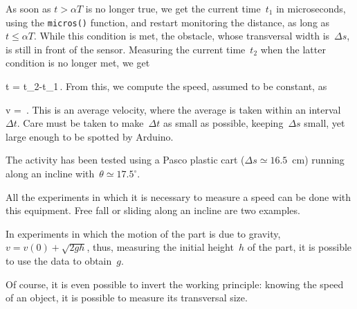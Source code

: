 \documentclass{extra}
\begin{document}
As soon as $t>\alpha T$ is no longer true, we get the current time~$t_1$ in microseconds, using the {\tt micros()} function, and restart monitoring the distance, as long as~$t\le \alpha T$. While this condition is met, the obstacle, whose transversal width is~$\Delta s$, is still in front of the sensor. Measuring the current time~$t_2$ when the latter condition is no longer met, we get

\beq
\Delta t = t_2-t_1\,.
\eeq
From this, we compute the speed, assumed to be constant, as

\beq
v = \,.
\eeq
This is an average velocity, where the average is taken within an interval~$\Delta t$. Care must be taken to make~$\Delta t$ as small as possible, keeping~$\Delta s$ small, yet large enough to be spotted by Arduino.

The activity has been tested using a Pasco\texttrademark{} plastic cart ($\Delta s\simeq 16.5$~cm) running along an incline with~$\theta\simeq 17.5^\circ$.

All the experiments in which it is necessary to measure a speed can be done with this equipment. Free fall or sliding along an incline are two examples.

In experiments in which the motion of the part is due to gravity, $v=v(0) + \sqrt{2gh}$, thus, measuring the initial height~$h$ of the part, it is possible to use the data to obtain~$g$.

Of course, it is even possible to invert the working principle: knowing the speed of an object, it is possible to measure its transversal size.
\end{document}
